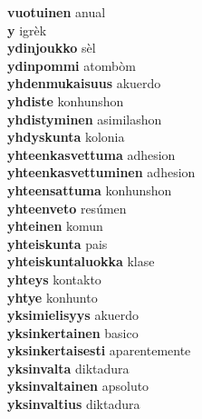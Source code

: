 \textbf{vuotuinen } anual \\
\textbf{y } igrèk \\
\textbf{ydinjoukko } sèl \\
\textbf{ydinpommi } atombòm \\
\textbf{yhdenmukaisuus } akuerdo \\
\textbf{yhdiste } konhunshon \\
\textbf{yhdistyminen } asimilashon \\
\textbf{yhdyskunta } kolonia \\
\textbf{yhteenkasvettuma } adhesion \\
\textbf{yhteenkasvettuminen } adhesion \\
\textbf{yhteensattuma } konhunshon \\
\textbf{yhteenveto } resúmen \\
\textbf{yhteinen } komun \\
\textbf{yhteiskunta } pais \\
\textbf{yhteiskuntaluokka } klase \\
\textbf{yhteys } kontakto \\
\textbf{yhtye } konhunto \\
\textbf{yksimielisyys } akuerdo \\
\textbf{yksinkertainen } basico \\
\textbf{yksinkertaisesti } aparentemente \\
\textbf{yksinvalta } diktadura \\
\textbf{yksinvaltainen } apsoluto \\
\textbf{yksinvaltius } diktadura \\
